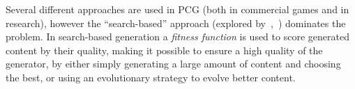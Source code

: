 \documentclass[a4paper,titlepage,final]{report}
\begin{document}
Several different approaches are used in PCG (both in commercial games and in research), however the ``search-based'' approach (explored by~\citet{togelius11search},~\citet{pcgbook:ch2}) dominates the problem.
In search-based generation a \textit{fitness function} is used to score generated content by their quality, making it possible to ensure a high quality of the generator, by either simply generating a large amount of content and choosing the best, or using an evolutionary strategy to evolve better content.







\end{document}
